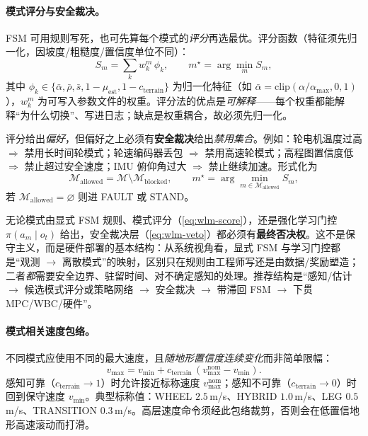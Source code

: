 \paragraph{模式评分与安全裁决。}
FSM 可用规则写死，也可先算每个模式的\emph{评分}再选最优。评分函数（特征须先归一化，因坡度/粗糙度/置信度单位不同）：
\begin{equation}
  S_m=\sum_k w_k^m\,\phi_k,\qquad
  m^\star=\arg\min_{m}S_m,
  \label{eq:wlm-score}
\end{equation}
其中 $\phi_k\in\{\bar\alpha,\bar\rho,\bar s,1-\mu_{\mathrm{est}},1-c_{\mathrm{terrain}}\}$ 为归一化特征（如 $\bar\alpha=\mathrm{clip}(\alpha/\alpha_{\max},0,1)$），$w_k^m$ 为可写入参数文件的权重。评分法的优点是\emph{可解释}——每个权重都能解释“为什么切换”、写进日志；缺点是权重耦合，故必须先归一化。

评分给出\emph{偏好}，但偏好之上必须有\textbf{安全裁决}给出\emph{禁用集合}。例如：轮电机温度过高 $\Rightarrow$ 禁用长时间轮模式；轮速编码器丢包 $\Rightarrow$ 禁用高速轮模式；高程图置信度低 $\Rightarrow$ 禁止超过安全速度；IMU 俯仰角过大 $\Rightarrow$ 禁止继续加速。形式化为
\begin{equation}
  \mathcal M_{\mathrm{allowed}}=\mathcal M\setminus\mathcal M_{\mathrm{blocked}},\qquad
  m^\star=\arg\min_{m\in\mathcal M_{\mathrm{allowed}}}S_m,
  \label{eq:wlm-veto}
\end{equation}
若 $\mathcal M_{\mathrm{allowed}}=\varnothing$ 则进 FAULT 或 STAND。

\begin{insight}\label{ins:wlm-veto}
无论模式由显式 FSM 规则、模式评分（\cref{eq:wlm-score}），还是强化学习门控 $\pi(a_m\mid o_t)$ 给出，安全裁决层（\cref{eq:wlm-veto}）都必须有\textbf{最终否决权}。这不是保守主义，而是硬件部署的基本结构：从系统视角看，显式 FSM 与学习门控都是“观测 $\to$ 离散模式”的映射，区别只在规则由工程师写还是由数据/奖励塑造；二者\emph{都}需要安全边界、驻留时间、对不确定感知的处理。推荐结构是“感知/估计 $\to$ 候选模式评分或策略网络 $\to$ 安全裁决 $\to$ 带滞回 FSM $\to$ 下贯 MPC/WBC/硬件”。
\end{insight}

\paragraph{模式相关速度包络。}
不同模式应使用不同的最大速度，且\emph{随地形置信度连续变化}而非简单限幅：
\begin{equation}
  v_{\max}=v_{\min}+c_{\mathrm{terrain}}\,(v_{\max}^{\mathrm{nom}}-v_{\min}).
  \label{eq:wlm-envelope}
\end{equation}
感知可靠（$c_{\mathrm{terrain}}\to1$）时允许接近标称速度 $v_{\max}^{\mathrm{nom}}$；感知不可靠（$c_{\mathrm{terrain}}\to0$）时回到保守速度 $v_{\min}$。典型标称值：WHEEL $2.5\,$m/s、HYBRID $1.0\,$m/s、LEG $0.5\,$m/s、TRANSITION $0.3\,$m/s。高层速度命令须经此包络裁剪，否则会在低置信地形高速滚动而打滑。


